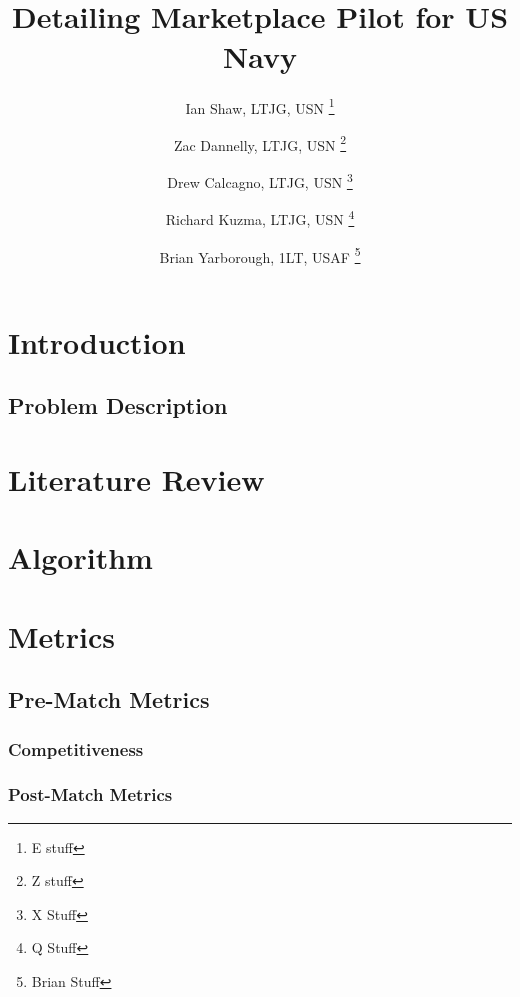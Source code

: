 \documentclass{article}
\title{\projectname \\ \large Detailing Marketplace Pilot for US Navy}
\author{Ian Shaw, LTJG, USN \thanks{E stuff} 
\and Zac Dannelly, LTJG, USN \thanks{Z stuff}
\and Drew Calcagno, LTJG, USN \thanks{X Stuff} 
\and Richard Kuzma, LTJG, USN \thanks{Q Stuff} 
\and Brian Yarborough, 1LT, USAF \thanks{Brian Stuff}}
\begin{document}
\maketitle

\begin{abstract}

\end{abstract}

\newpage

\tableofcontents

\newpage

\section{Introduction}



\subsection{Problem Description}



\section{Literature Review}



\section{Algorithm}



\section{Metrics}

\subsection{Pre-Match Metrics}

\subsubsection{Competitiveness}



\subsubsection{Post-Match Metrics}
\end{document}
